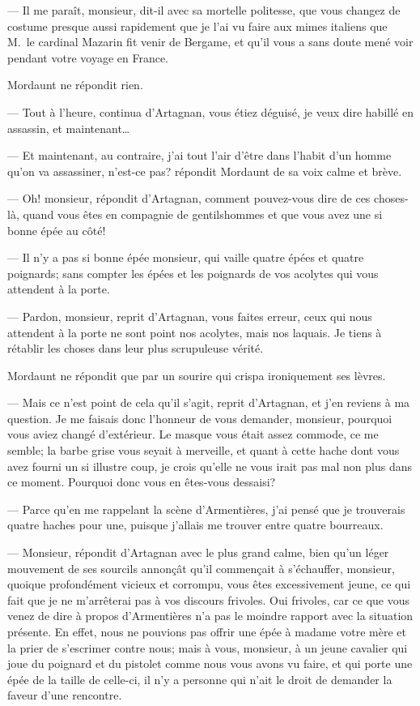 — Il me paraît, monsieur, dit-il avec sa mortelle politesse, que vous changez de costume presque aussi rapidement que je l'ai vu faire aux mimes italiens que M.~le cardinal Mazarin fit venir de Bergame, et qu'il vous a sans doute mené voir pendant votre voyage en France.

Mordaunt ne répondit rien.

— Tout à l'heure, continua d'Artagnan, vous étiez déguisé, je veux dire habillé en assassin, et maintenant\dots

— Et maintenant, au contraire, j'ai tout l'air d'être dans l'habit d'un homme qu'on va assassiner, n'est-ce pas? répondit Mordaunt de sa voix calme et brève.

— Oh! monsieur, répondit d'Artagnan, comment pouvez-vous dire de ces choses-là, quand vous êtes en compagnie de gentilshommes et que vous avez une si bonne épée au côté!

— Il n'y a pas si bonne épée monsieur, qui vaille quatre épées et quatre poignards; sans compter les épées et les poignards de vos acolytes qui vous attendent à la porte.

— Pardon, monsieur, reprit d'Artagnan, vous faites erreur, ceux qui nous attendent à la porte ne sont point nos acolytes, mais nos laquais. Je tiens à rétablir les choses dans leur plus scrupuleuse vérité.

Mordaunt ne répondit que par un sourire qui crispa ironiquement ses lèvres.

— Mais ce n'est point de cela qu'il s'agit, reprit d'Artagnan, et j'en reviens à ma question. Je me faisais donc l'honneur de vous demander, monsieur, pourquoi vous aviez changé d'extérieur. Le masque vous était assez commode, ce me semble; la barbe grise vous seyait à merveille, et quant à cette hache dont vous avez fourni un si illustre coup, je crois qu'elle ne vous irait pas mal non plus dans ce moment. Pourquoi donc vous en êtes-vous dessaisi?

— Parce qu'en me rappelant la scène d'Armentières, j'ai pensé que je trouverais quatre haches pour une, puisque j'allais me trouver entre quatre bourreaux.

— Monsieur, répondit d'Artagnan avec le plus grand calme, bien qu'un léger mouvement de ses sourcils annonçât qu'il commençait à s'échauffer, monsieur, quoique profondément vicieux et corrompu, vous êtes excessivement jeune, ce qui fait que je ne m'arrêterai pas à vos discours frivoles. Oui frivoles, car ce que vous venez de dire à propos d'Armentières n'a pas le moindre rapport avec la situation présente. En effet, nous ne pouvions pas offrir une épée à madame votre mère et la prier de s'escrimer contre nous; mais à vous, monsieur, à un jeune cavalier qui joue du poignard et du pistolet comme nous vous avons vu faire, et qui porte une épée de la taille de celle-ci, il n'y a personne qui n'ait le droit de demander la faveur d'une rencontre.

